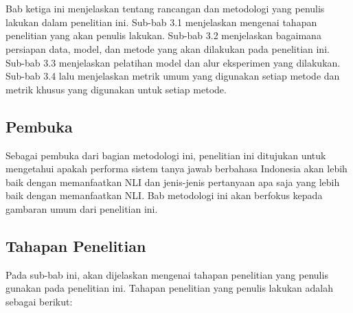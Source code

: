 \chapter{\babTiga}
Bab ketiga ini menjelaskan tentang rancangan dan metodologi yang penulis lakukan dalam penelitian ini. Sub-bab 3.1 menjelaskan mengenai tahapan penelitian yang akan penulis lakukan. Sub-bab 3.2 menjelaskan bagaimana persiapan data, model, dan metode yang akan dilakukan pada penelitian ini. Sub-bab 3.3 menjelaskan pelatihan model dan alur eksperimen yang dilakukan. Sub-bab 3.4 lalu menjelaskan metrik umum yang digunakan setiap metode dan metrik khusus yang digunakan untuk setiap metode.

\section{Pembuka}

Sebagai pembuka dari bagian metodologi ini, penelitian ini ditujukan untuk mengetahui apakah performa sistem tanya jawab berbahasa Indonesia akan lebih baik dengan memanfaatkan NLI dan jenis-jenis pertanyaan apa saja yang lebih baik dengan memanfaatkan NLI. Bab metodologi ini akan berfokus kepada gambaran umum dari penelitian ini.

\section{Tahapan Penelitian}
Pada sub-bab ini, akan dijelaskan mengenai tahapan penelitian yang penulis gunakan pada penelitian ini. Tahapan penelitian yang penulis lakukan adalah sebagai berikut:

